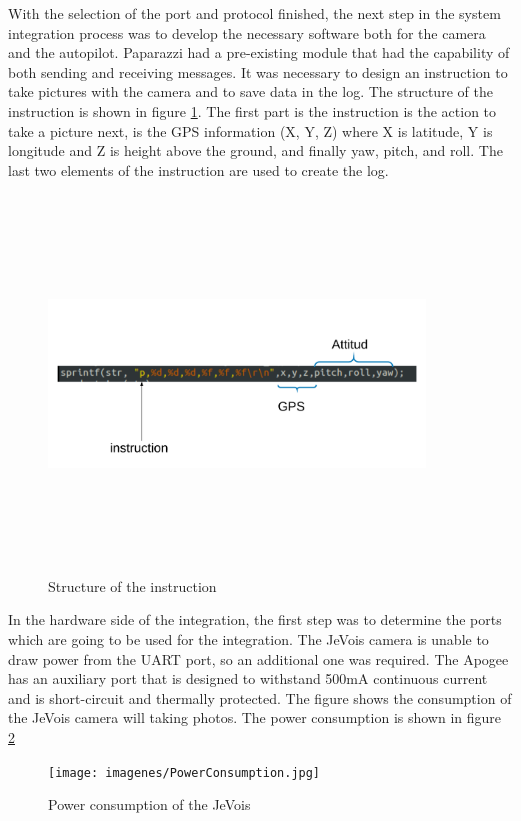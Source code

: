 With the selection of the port and protocol finished, the next step in the system integration process was to develop the necessary software both for the camera and the autopilot. Paparazzi had a pre-existing module that had the capability of both sending and receiving messages. It was necessary to design an instruction to take pictures with the camera and to save data in the log. The structure of the instruction is shown in figure \ref{fig:instruction}. The first part is the instruction is the action to take a picture next, is the GPS information (X, Y, Z) where X is latitude, Y is longitude and Z is height above the ground, and finally yaw, pitch, and roll. The last two elements of the instruction are used to create the log.
\begin{figure}[H]
\centering
\includegraphics[width=10cm,height=10cm,keepaspectratio]{imagenes/Instruction.png}
\caption{Structure of the instruction}
\label{fig:instruction}
\end{figure}
In the hardware side of the integration, the first step was to determine the ports which are going to be used  for the integration. The JeVois camera is unable to draw power from the UART port, so an additional one was required. The Apogee has an auxiliary port that is designed to withstand 500mA continuous current and is short-circuit and thermally protected. The figure shows the consumption of the JeVois camera will taking photos. The power consumption is shown in figure \ref{fig:poweer}
\begin{figure}[H]
\centering
\texttt{[image: imagenes/PowerConsumption.jpg]}
\caption{Power consumption of the JeVois}
\label{fig:poweer}
\end{figure}

